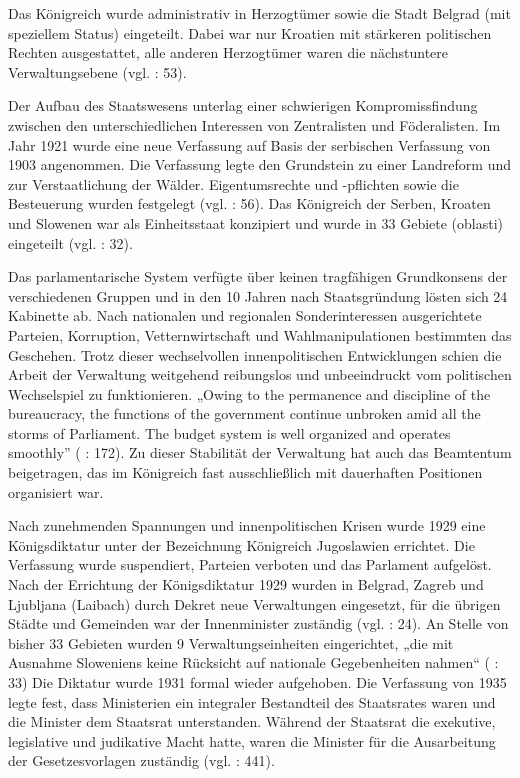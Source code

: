 Das Königreich wurde administrativ in Herzogtümer sowie die Stadt Belgrad (mit speziellem Status) eingeteilt. Dabei war nur Kroatien mit stärkeren politischen Rechten ausgestattet, alle anderen Herzogtümer waren die nächstuntere Verwaltungsebene (vgl. \cite{sevic} : 53).\par
Der Aufbau des Staatswesens unterlag einer schwierigen Kompromissfindung zwischen den unterschiedlichen Interessen von Zentralisten und Föderalisten. Im Jahr 1921 wurde eine neue Verfassung auf Basis der serbischen Verfassung von 1903 angenommen. Die Verfassung legte den Grundstein zu einer Landreform und zur Verstaatlichung der Wälder. Eigentumsrechte und -pflichten sowie die Besteuerung wurden festgelegt (vgl. \cite{beardradin} : 56). Das Königreich der Serben, Kroaten und Slowenen war als Einheitsstaat konzipiert und wurde in 33 Gebiete (oblasti) eingeteilt (vgl. \cite{beckm90} : 32).\par
Das parlamentarische System verfügte über keinen tragfähigen Grundkonsens der verschiedenen Gruppen und in den 10 Jahren nach Staatsgründung lösten sich 24 Kabinette ab. Nach nationalen und regionalen Sonderinteressen ausgerichtete Parteien, Korruption, Vetternwirtschaft und Wahlmanipulationen bestimmten das Geschehen. Trotz dieser wechselvollen innenpolitischen Entwicklungen schien die Arbeit der Verwaltung weitgehend reibungslos und unbeeindruckt vom politischen Wechselspiel zu funktionieren. „Owing to the permanence and discipline of the bureaucracy, the functions of the government continue unbroken amid all the storms of Parliament. The budget system is well organized and operates smoothly” (\cite{beardradin} : 172). Zu dieser Stabilität der Verwaltung hat auch das Beamtentum beigetragen, das im Königreich fast ausschließlich mit dauerhaften Positionen organisiert war.\par
Nach zunehmenden Spannungen und innenpolitischen Krisen wurde 1929 eine Königsdiktatur unter der Bezeichnung Königreich Jugoslawien errichtet. Die Verfassung wurde suspendiert, Parteien verboten und das Parlament aufgelöst. Nach der Errichtung der Königsdiktatur 1929 wurden in Belgrad, Zagreb und Ljubljana (Laibach) durch Dekret neue Verwaltungen eingesetzt, für die übrigen Städte und Gemeinden war der Innenminister zuständig (vgl. \cite{libal} : 24). An Stelle von bisher 33 Gebieten wurden 9 Verwaltungseinheiten eingerichtet, „die mit Ausnahme Sloweniens keine Rücksicht auf nationale Gegebenheiten nahmen“ (\cite{beckm90} : 33) Die Diktatur wurde 1931 formal wieder aufgehoben. Die Verfassung von 1935 legte fest, dass Ministerien ein integraler Bestandteil des Staatsrates waren und die Minister dem Staatsrat unterstanden. Während der Staatsrat die exekutive, legislative und judikative Macht hatte, waren die Minister für die Ausarbeitung der Gesetzesvorlagen zuständig (vgl. \cite{kinhil} : 441).

